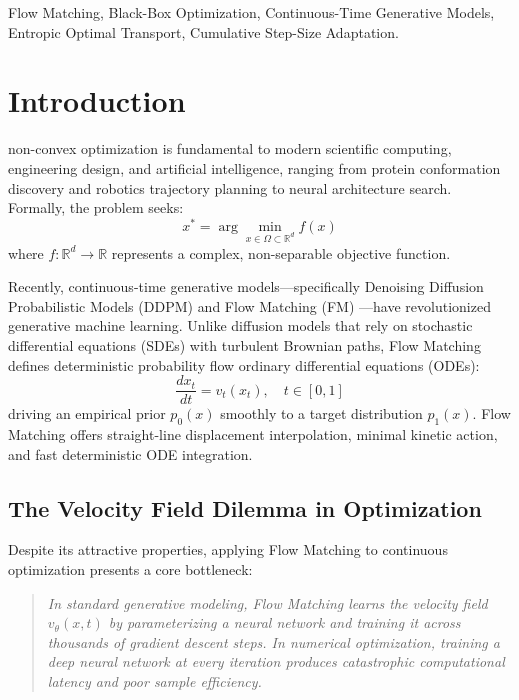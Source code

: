 \documentclass[10pt,journal,compsoc]{IEEEtran}
\begin{document}
{\begin{IEEEkeywords}
Flow Matching, Black-Box Optimization, Continuous-Time Generative Models, Entropic Optimal Transport, Cumulative Step-Size Adaptation.
\end{IEEEkeywords}}

\maketitle
\IEEEdisplaynontitleabstractindextext
\IEEEpeerreviewmaketitle

\section{Introduction}
 non-convex optimization is fundamental to modern scientific computing, engineering design, and artificial intelligence, ranging from protein conformation discovery and robotics trajectory planning to neural architecture search. Formally, the problem seeks:
\begin{equation}
x^* = \arg\min_{x \in \Omega \subset \mathbb{R}^d} f(x)
\end{equation}
where $f: \mathbb{R}^d \to \mathbb{R}$ represents a complex, non-separable objective function.

Recently, continuous-time generative models—specifically Denoising Diffusion Probabilistic Models (DDPM) \cite{ho2020denoising} and Flow Matching (FM) \cite{lipman2022flow}—have revolutionized generative machine learning. Unlike diffusion models that rely on stochastic differential equations (SDEs) with turbulent Brownian paths, Flow Matching defines deterministic probability flow ordinary differential equations (ODEs):
\begin{equation}
\frac{d x_t}{dt} = v_t(x_t), \quad t \in [0, 1]
\end{equation}
driving an empirical prior $p_0(x)$ smoothly to a target distribution $p_1(x)$. Flow Matching offers straight-line displacement interpolation, minimal kinetic action, and fast deterministic ODE integration.

\subsection{The Velocity Field Dilemma in Optimization}
Despite its attractive properties, applying Flow Matching to continuous optimization presents a core bottleneck:
\begin{quote}
\textit{In standard generative modeling, Flow Matching learns the velocity field $v_\theta(x, t)$ by parameterizing a neural network and training it across thousands of gradient descent steps. In numerical optimization, training a deep neural network at every iteration produces catastrophic computational latency and poor sample efficiency.}
\end{quote}
\end{document}
